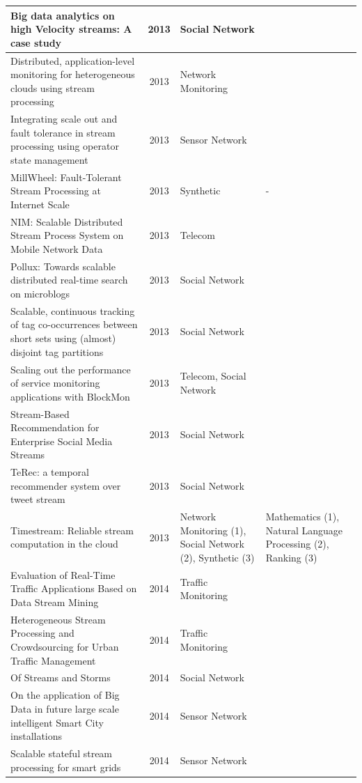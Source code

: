 \documentclass[ppgc,diss,english]{iiufrgs}
\begin{document}
\begin{center}
\begin{longtable}{ | p{8cm} | c | p{3cm} | p{2.5cm} |}
		Big data analytics on high Velocity streams: A case study \cite{chardonnens2013big} & 2013 & Social Network & \\\hline
		Distributed, application-level monitoring for heterogeneous clouds using stream processing \cite{smit2013distributed} & 2013 & Network Monitoring & \\\hline
		Integrating scale out and fault tolerance in stream processing using operator state management \cite{CastroFernandez:2013:ISO:2463676.2465282} & 2013 & Sensor Network & \\\hline
		MillWheel: Fault-Tolerant Stream Processing at Internet Scale \cite{akidau2013millwheel} & 2013 & Synthetic & - \\\hline
		NIM: Scalable Distributed Stream Process System on Mobile Network Data \cite{pan2013nim} & 2013 & Telecom & \\\hline
		Pollux: Towards scalable distributed real-time search on microblogs \cite{lin2013pollux} & 2013 & Social Network & \\\hline
		Scalable, continuous tracking of tag co-occurrences between short sets using (almost) disjoint tag partitions \cite{alvanaki2013scalable} & 2013 & Social Network & \\\hline
		Scaling out the performance of service monitoring applications with BlockMon \cite{simoncelli2013scaling} & 2013 & Telecom, Social Network & \\\hline
		Stream-Based Recommendation for Enterprise Social Media Streams \cite{lunze2013stream} & 2013 & Social Network & \\\hline
		TeRec: a temporal recommender system over tweet stream \cite{chen2013terec} & 2013 & Social Network & \\\hline
		Timestream: Reliable stream computation in the cloud \cite{qian2013timestream} & 2013 & Network Monitoring (1), Social Network (2), Synthetic (3) & Mathematics (1), Natural Language Processing (2), Ranking (3) \\\hline
		Evaluation of Real-Time Traffic Applications Based on Data Stream Mining \cite{geisler2014evaluation} & 2014 & Traffic Monitoring & \\\hline
		Heterogeneous Stream Processing and Crowdsourcing for Urban Traffic Management \cite{artikis2014heterogeneous} & 2014 & Traffic Monitoring & \\\hline
		Of Streams and Storms \cite{nabi2014streams} & 2014 & Social Network & \\\hline
		On the application of Big Data in future large scale intelligent Smart City installations \cite{girtelschmid2014application} & 2014 & Sensor Network & \\\hline
		Scalable stateful stream processing for smart grids \cite{fernandez2014scalable} & 2014 & Sensor Network & \\\hline
		

\end{longtable}
\end{center}
\end{document}
